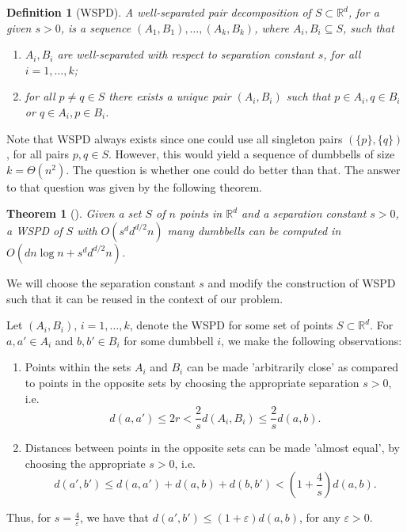\documentclass{article}
\newtheorem{definition}{Definition}
\newtheorem{theorem}{Theorem}
\begin{document}
\begin{definition}[WSPD]\label{wspd:def}
A well-separated pair decomposition of $S\subset \mathbb{R}^d$, for a given $s>0$, is 
a sequence $(A_1, B_1), \ldots, (A_k, B_k)$, where $A_i, B_i\subseteq S$, such that 
\begin{enumerate}
    \item $A_i, B_i$ are well-separated with respect to separation constant $s$, for all $i=1,\ldots, k$;
    \item for all $p\neq q\in S$ there exists a unique pair $(A_i, B_i)$ such that 
    $p\in A_i, q\in B_i$ or $q\in A_i, p\in B_i$. 
\end{enumerate}
\end{definition}
Note that WSPD always exists since one could use all singleton pairs $(\{p\},\{q\})$, 
for all pairs $p, q\in S$. However, this would yield a sequence of dumbbells of size
$k = \Theta(n^2)$. The  question is whether one could do better than that. The 
answer to that question was given by the following theorem.
\begin{theorem}[\cite{callahan95}]\label{tm:WSPD}
Given a set $S$ of $n$ points in $\mathbb{R}^d$ and a separation constant $s>0$, 
a WSPD of $S$ with $O(s^d d^{d/2}n)$ many dumbbells can be computed in 
$O(dn\log n + s^d d^{d/2}n)$.
\end{theorem}

We will choose the separation constant $s$ and modify the construction of WSPD such that it can be reused in the context 
of our problem. 

Let $(A_i, B_i)$, $i=1, \ldots, k$, denote the WSPD for some set of points $S\subset \mathbb{R}^d$. 
For $a, a' \in A_i$ and $b, b' \in B_i$ for some dumbbell $i$, we make the following observations:
\begin{enumerate}
    \item Points within the sets $A_i$ and $B_i$ can be made 'arbitrarily close' as compared to points in the opposite sets by choosing the appropriate 
    separation $s>0$, i.e. 
        \begin{equation}
            d(a, a') \le 2 r < \frac{2}{s} d(A_i, B_i) \le \frac{2}{s} d(a, b) .
        \end{equation}
    \item Distances between points in the opposite sets can be made 'almost equal', by choosing the appropriate $s>0$, i.e. 
        \begin{equation}\label{eq:wspd_guarantee}
                d(a', b') \le d(a, a') + d(a, b) + d(b, b') < (1+\frac{4}{s}) d(a, b).
        \end{equation}
\end{enumerate}
Thus, for $s = \frac{4}{\varepsilon}$, we have that $d(a', b')\le (1+\varepsilon) d(a, b)$, for any $\varepsilon>0$.
\end{document}

